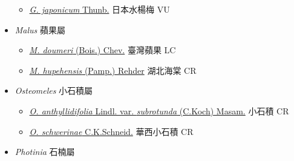 \begin{itemize}
  \begin{itemize}
        \item[] \href{http://www.theplantlist.org/tpl1.1/search?q=Geum+japonicum}{\textit{G. japonicum} Thunb.}   日本水楊梅   VU
  \end{itemize}
 \item[] \textit{Malus} 蘋果屬
                                
  \begin{itemize}
        \item[] \href{http://www.theplantlist.org/tpl1.1/search?q=Malus+doumeri}{\textit{M. doumeri} (Bois.) Chev.}   臺灣蘋果   LC
        \item[] \href{http://www.theplantlist.org/tpl1.1/search?q=Malus+hupehensis}{\textit{M. hupehensis} (Pamp.) Rehder}   湖北海棠   CR
  \end{itemize}
 \item[] \textit{Osteomeles} 小石積屬
                                
  \begin{itemize}
        \item[] \href{http://www.theplantlist.org/tpl1.1/search?q=Osteomeles+anthyllidifolia+var.+subrotunda}{\textit{O. anthyllidifolia} Lindl. var. \textit{subrotunda} (C.Koch) Masam.}   小石積   CR
        \item[] \href{http://www.theplantlist.org/tpl1.1/search?q=Osteomeles+schwerinae}{\textit{O. schwerinae} C.K.Schneid.}   華西小石積   CR
  \end{itemize}
 \item[] \textit{Photinia} 石楠屬
                                

\end{itemize}
